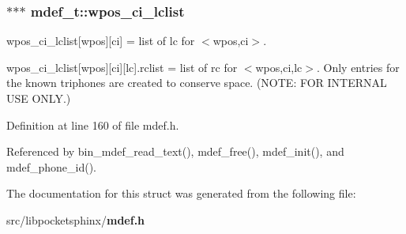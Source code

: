\subsubsection[{wpos\-\_\-ci\-\_\-lclist}]{$\ast$$\ast$$\ast$ {\bf mdef\-\_\-t\-::wpos\-\_\-ci\-\_\-lclist}}\label{structmdef__t_a5dd5c3d3058a314f4c971a14d1df5f38}


wpos\-\_\-ci\-\_\-lclist[wpos][ci] = list of lc for $<$wpos,ci$>$. 

wpos\-\_\-ci\-\_\-lclist[wpos][ci][lc].rclist = list of rc for $<$wpos,ci,lc$>$. \-Only entries for the known triphones are created to conserve space. (\-N\-O\-T\-E\-: \-F\-O\-R \-I\-N\-T\-E\-R\-N\-A\-L \-U\-S\-E \-O\-N\-L\-Y.) 

\-Definition at line 160 of file mdef.\-h.



\-Referenced by bin\-\_\-mdef\-\_\-read\-\_\-text(), mdef\-\_\-free(), mdef\-\_\-init(), and mdef\-\_\-phone\-\_\-id().



\-The documentation for this struct was generated from the following file\-:\begin{DoxyCompactItemize}
\item 
src/libpocketsphinx/{\bf mdef.\-h}\end{DoxyCompactItemize}
